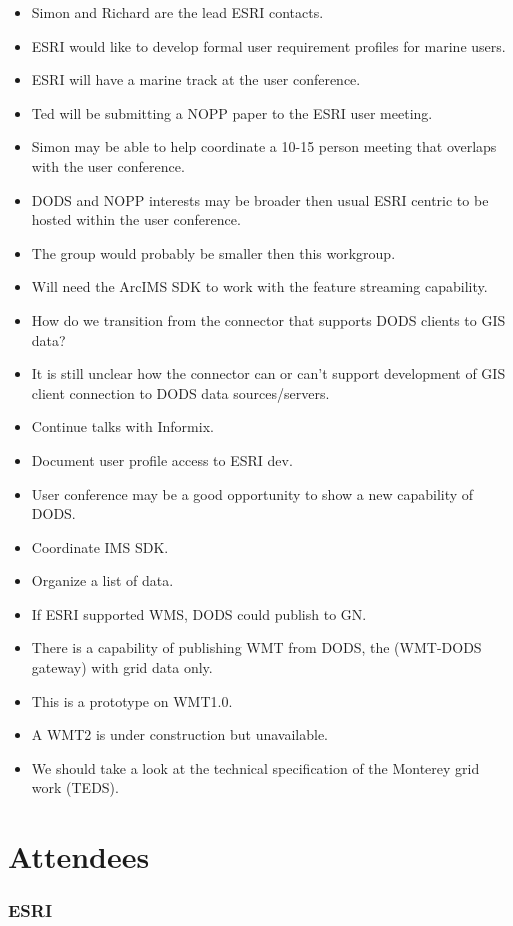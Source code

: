 \begin{itemize}
\item Simon and Richard are the lead ESRI contacts.
\item ESRI would like to develop formal user requirement profiles for marine users.
\item ESRI will have a marine track at the user conference.
\item Ted will be submitting a NOPP paper to the ESRI user meeting.
\item Simon may be able to help coordinate a 10-15 person meeting that overlaps with the user 
conference.
\item DODS and NOPP interests may be broader then usual ESRI centric to be hosted within 
the user conference.
\item The group would probably be smaller then this workgroup.
\item Will need the ArcIMS SDK to work with the feature streaming capability.
\item How do we transition from the connector that supports DODS clients to GIS data?
\item It is still unclear how the connector can or can't support development of GIS client 
connection to DODS data sources/servers.
\item Continue talks with Informix.
\item Document user profile access to ESRI dev.
\item User conference may be a good opportunity to show a new capability of DODS.
\item Coordinate IMS SDK.
\item Organize a list of data.
\item If ESRI supported WMS, DODS could publish to GN.
\item There is a capability of publishing WMT from DODS, the (WMT-DODS gateway) with 
grid data only.
\item This is a prototype on WMT1.0.
\item A WMT2 is under construction but unavailable.
\item We should take a look at the technical specification of the Monterey grid work (TEDS).
\end{itemize}

\section{Attendees}

\subsubsection{ESRI}

